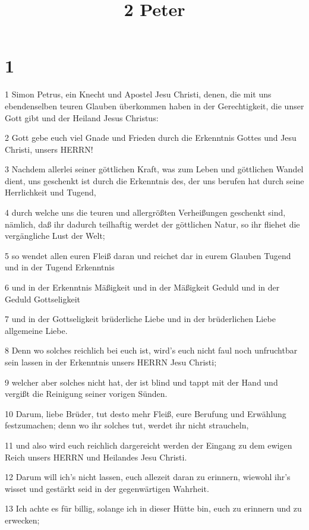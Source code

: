 

\title{2 Peter}


\chapter{1}

\par 1 Simon Petrus, ein Knecht und Apostel Jesu Christi, denen, die mit uns ebendenselben teuren Glauben überkommen haben in der Gerechtigkeit, die unser Gott gibt und der Heiland Jesus Christus:
\par 2 Gott gebe euch viel Gnade und Frieden durch die Erkenntnis Gottes und Jesu Christi, unsers HERRN!
\par 3 Nachdem allerlei seiner göttlichen Kraft, was zum Leben und göttlichen Wandel dient, uns geschenkt ist durch die Erkenntnis des, der uns berufen hat durch seine Herrlichkeit und Tugend,
\par 4 durch welche uns die teuren und allergrößten Verheißungen geschenkt sind, nämlich, daß ihr dadurch teilhaftig werdet der göttlichen Natur, so ihr fliehet die vergängliche Lust der Welt;
\par 5 so wendet allen euren Fleiß daran und reichet dar in eurem Glauben Tugend und in der Tugend Erkenntnis
\par 6 und in der Erkenntnis Mäßigkeit und in der Mäßigkeit Geduld und in der Geduld Gottseligkeit
\par 7 und in der Gottseligkeit brüderliche Liebe und in der brüderlichen Liebe allgemeine Liebe.
\par 8 Denn wo solches reichlich bei euch ist, wird's euch nicht faul noch unfruchtbar sein lassen in der Erkenntnis unsers HERRN Jesu Christi;
\par 9 welcher aber solches nicht hat, der ist blind und tappt mit der Hand und vergißt die Reinigung seiner vorigen Sünden.
\par 10 Darum, liebe Brüder, tut desto mehr Fleiß, eure Berufung und Erwählung festzumachen; denn wo ihr solches tut, werdet ihr nicht straucheln,
\par 11 und also wird euch reichlich dargereicht werden der Eingang zu dem ewigen Reich unsers HERRN und Heilandes Jesu Christi.
\par 12 Darum will ich's nicht lassen, euch allezeit daran zu erinnern, wiewohl ihr's wisset und gestärkt seid in der gegenwärtigen Wahrheit.
\par 13 Ich achte es für billig, solange ich in dieser Hütte bin, euch zu erinnern und zu erwecken;

